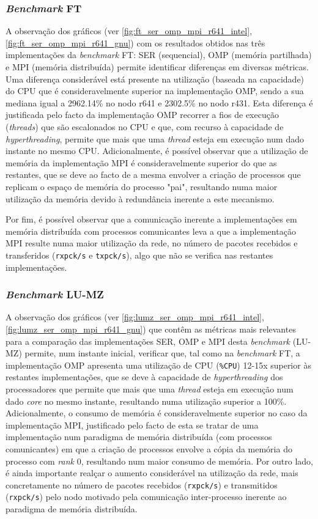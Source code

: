 \documentclass{article}
\begin{document}
\subsubsection{\textit{Benchmark} FT}

\quad A observação dos gráficos (ver \ref{fig:ft_ser_omp_mpi_r641_intel}, \ref{fig:ft_ser_omp_mpi_r641_gnu}) com os resultados obtidos nas três 
implementações da \textit{benchmark} FT: SER (sequencial), OMP (memória partilhada) e MPI (memória distribuída) permite identificar diferenças em 
diversas métricas.
Uma diferença considerável está presente na utilização (baseada na capacidade) do CPU que é consideravelmente superior na implementação OMP, sendo
a sua mediana igual a 2962.14\% no nodo r641 e 2302.5\% no nodo r431. Esta diferença é justificada pelo facto da implementação OMP recorrer a fios de 
execução (\textit{threads}) que são escalonados no CPU e que, com recurso à capacidade de \textit{hyperthreading}, permite que mais que uma \textit{thread}
esteja em execução num dado instante no mesmo CPU.
Adicionalmente, é possível observar que a utilização de memória da implementação MPI é consideravelmente superior do que as restantes, que se deve
ao facto de a mesma envolver a criação de processos que replicam o espaço de memória do processo "pai", resultando numa maior utilização da memória
devido à redundância inerente a este mecanismo.

Por fim, é possível observar que a comunicação inerente a implementações em memória distribuída com processos comunicantes leva a que a implementação 
MPI resulte numa maior utilização da rede, no número de pacotes recebidos e transferidos (\texttt{rxpck/s} e \texttt{txpck/s}), algo que não se verifica
nas restantes implementações.


\subsubsection{\textit{Benchmark} LU-MZ}

A observação dos gráficos (ver \ref{fig:lumz_ser_omp_mpi_r641_intel}, \ref{fig:lumz_ser_omp_mpi_r641_gnu}) que contêm as métricas mais relevantes para a
comparação das implementações SER, OMP e MPI desta \textit{benchmark} (LU-MZ) permite, num instante inicial, verificar que, tal como na \textit{benchmark} FT, 
a implementação OMP apresenta uma utilização de CPU (\texttt{\%CPU}) 12-15x superior às restantes implementações, que se deve à capacidade de 
\textit{hyperthreading} dos processadores que permite que mais que uma \textit{thread} esteja em execução num dado \textit{core} no mesmo instante, resultando 
numa utilização superior a 100\%. 
Adicionalmente, o consumo de memória é consideravelmente superior no caso da implementação MPI, justificado pelo facto de esta se tratar de uma implementação num 
paradigma de memória distribuída (com processos comunicantes) em que a criação de processos envolve a cópia da memória do processo com \textit{rank} 0, 
resultando num maior consumo de memória. Por outro lado, é ainda importante realçar o aumento considerável na utilização da rede, mais concretamente no 
número de pacotes recebidos (\texttt{rxpck/s}) e transmitidos (\texttt{rxpck/s}) pelo nodo motivado pela comunicação inter-processo inerente ao paradigma 
de memória distribuída.
\end{document}
